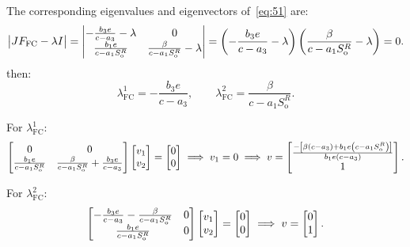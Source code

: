 The corresponding eigenvalues and eigenvectors of~\eqref{eq:51}
are:
\begin{equation*}
	\begin{vmatrix}
		JF_{\text{FC}}-\lambda I
	\end{vmatrix}=
	\begin{vmatrix}
		-\frac{b_{3}e}{c-a_{3}}-\lambda        & 0                                             \\[.5\baselineskip]
		\frac{b_{1}e}{c-a_{1}S^{R}_{\text{o}}} & \frac{\beta}{c-a_{1}S^{R}_{\text{o}}}-\lambda
	\end{vmatrix}=
	\left(-\frac{b_{3}e}{c-a_{3}}-\lambda\right)
	\left(\frac{\beta}{c-a_{1}S^{R}_{\text{o}}}-\lambda\right)=
	0.
\end{equation*}
then:
\begin{equation*}
	\lambda^{1}_{\text{FC}}=
	-\frac{b_{3}e}{c-a_{3}},\qquad
	\lambda^{2}_{\text{FC}}=
	\frac{\beta}{c-a_{1}S^{R}_{\text{o}}}.
\end{equation*}

For $\lambda^{1}_{\text{FC}}$:
\begin{equation*}
	\begin{bmatrix}
		0                                      & 0                                                            \\[.5\baselineskip]
		\frac{b_{1}e}{c-a_{1}S^{R}_{\text{o}}} & \frac{\beta}{c-a_{1}S^{R}_{\text{o}}}+\frac{b_{3}e}{c-a_{3}}
	\end{bmatrix}
	\begin{bmatrix}
		v_{1} \\
		v_{2}
	\end{bmatrix}=
	\begin{bmatrix}
		0 \\
		0
	\end{bmatrix}\implies
	v_{1}=0\implies
	v=\begin{bmatrix}
		\frac{-\left[\beta\left(c-a_{3}\right)+b_{1}e\left(c-a_{1}S^{R}_{\text{o}}\right)\right]}{b_{1}e\left(c-a_{3}\right)} \\
		1
	\end{bmatrix}.
\end{equation*}

For $\lambda^{2}_{\text{FC}}$:
\begin{equation*}
	\begin{bmatrix}
		-\frac{b_{3}e}{c-a_{3}}-\frac{\beta}{c-a_{1}S^{R}_{\text{o}}} & 0 \\[.5\baselineskip]
		\frac{b_{1}e}{c-a_{1}S^{R}_{\text{o}}}                        & 0
	\end{bmatrix}
	\begin{bmatrix}
		v_{1} \\
		v_{2}
	\end{bmatrix}=
	\begin{bmatrix}
		0 \\
		0
	\end{bmatrix}\implies
	v=\begin{bmatrix}
		0 \\
		1
	\end{bmatrix}.
\end{equation*}

